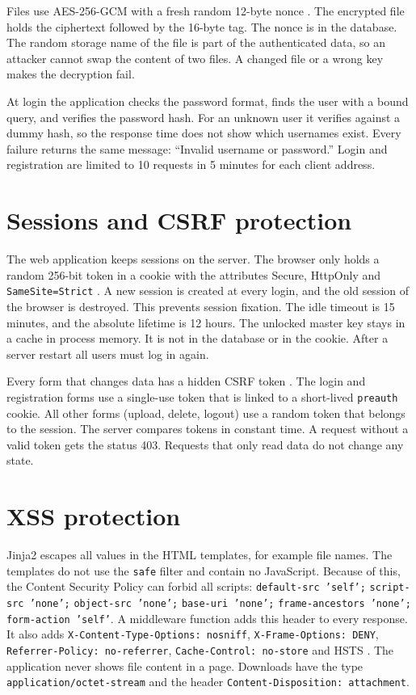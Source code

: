Files use AES-256-GCM with a fresh random 12-byte nonce \cite{nistgcm}. The encrypted file holds the ciphertext followed by the 16-byte tag. The nonce is in the database. The random storage name of the file is part of the authenticated data, so an attacker cannot swap the content of two files. A changed file or a wrong key makes the decryption fail.

At login the application checks the password format, finds the user with a bound query, and verifies the password hash. For an unknown user it verifies against a dummy hash, so the response time does not show which usernames exist. Every failure returns the same message: ``Invalid username or password.'' Login and registration are limited to 10 requests in 5 minutes for each client address.

\section{Sessions and CSRF protection}

The web application keeps sessions on the server. The browser only holds a random 256-bit token in a cookie with the attributes Secure, HttpOnly and \texttt{SameSite=Strict} \cite{owaspSessions}. A new session is created at every login, and the old session of the browser is destroyed. This prevents session fixation. The idle timeout is 15 minutes, and the absolute lifetime is 12 hours. The unlocked master key stays in a cache in process memory. It is not in the database or in the cookie. After a server restart all users must log in again.

Every form that changes data has a hidden CSRF token \cite{owaspCsrf}. The login and registration forms use a single-use token that is linked to a short-lived \texttt{preauth} cookie. All other forms (upload, delete, logout) use a random token that belongs to the session. The server compares tokens in constant time. A request without a valid token gets the status 403. Requests that only read data do not change any state.

\section{XSS protection}

Jinja2 escapes all values in the HTML templates, for example file names. The templates do not use the \texttt{safe} filter and contain no JavaScript. Because of this, the Content Security Policy can forbid all scripts: \texttt{default-src 'self';} \texttt{script-src 'none';} \texttt{object-src 'none';} \texttt{base-uri 'none';} \texttt{frame-ancestors 'none';} \texttt{form-action 'self'}. A middleware function adds this header to every response. It also adds \texttt{X-Content-Type-Options: nosniff}, \texttt{X-Frame-Options: DENY}, \texttt{Referrer-Policy: no-referrer}, \texttt{Cache-Control: no-store} and HSTS \cite{rfc6797}. The application never shows file content in a page. Downloads have the type \texttt{application/octet-stream} and the header \texttt{Content-Disposition: attachment}.

